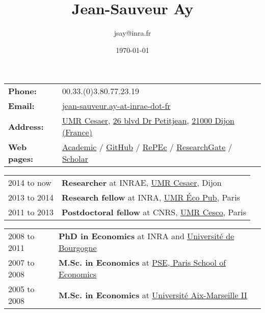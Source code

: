 \documentclass[11pt, a4paper]{./style}
\author{jsay@inra.fr}
\date{\today}
\title{Jean-Sauveur Ay}
\begin{document}
\maketitle


\label{sec:org7ad04d8}

\begin{center}
\begin{tabular}{ll}
\textbf{Phone:} & 00.33.(0)3.80.77.23.19\\[0pt]
\textbf{Email:} & \href{mailto:jean-sauveur.ay@inrae.fr}{jean-sauveur.ay-at-inrae-dot-fr}\\[0pt]
\textbf{Address:} & \href{https://www2.dijon.inrae.fr/cesaer/en/axis/}{UMR Cesaer}, \href{https://www.google.com/maps/?q\%3D47.3097819,5.0644835}{26 blvd Dr Petitjean}, \href{https://www.google.com/maps/place/21000+Dijon/}{21000 Dijon (France)}\\[0pt]
\textbf{Web pages:} & \href{https://www2.dijon.inrae.fr/cesaer/membres/jean-sauveur-ay/}{Academic} / \href{http://github.com/jsay/}{GitHub} / \href{https://ideas.repec.org/e/pay77.html}{RePEc} / \href{https://www.researchgate.net/profile/Jean\_Sauveur\_Ay}{ResearchGate} / \href{https://scholar.google.fr/citations?user=arEwxlIAAAAJ\&hl=fr}{Scholar}\\[0pt]
\end{tabular}
\end{center}

\label{sec:orgf5b8415}

\begin{center}
\begin{tabular}{ll}
2014 to now & \textbf{Researcher} at INRAE, \href{https://www2.dijon.inrae.fr/cesaer/en/axis/}{UMR Cesaer}, Dijon\\[0pt]
2013 to 2014 & \textbf{Research fellow} at INRA, \href{https://www6.versailles-grignon.inrae.fr/economie\_publique\_eng/}{UMR Éco Pub}, Paris\\[0pt]
2011 to 2013 & \textbf{Postdoctoral fellow} at CNRS, \href{http://cesco.mnhn.fr/en}{UMR Cesco}, Paris\\[0pt]
\end{tabular}
\end{center}

\label{sec:org7789a0a}

\begin{center}
\begin{tabular}{ll}
2008 to 2011 & \textbf{PhD in Economics} at INRA and \href{http://en.u-bourgogne.fr/}{Université de Bourgogne}\\[0pt]
2007 to 2008 & \textbf{M.Sc. in Economics} at \href{https://www.parisschoolofeconomics.eu/en/}{PSE, Paris School of Economics}\\[0pt]
2005 to 2008 & \textbf{M.Sc. in Economics} at \href{https://www.amse-aixmarseille.fr/en}{Université Aix-Marseille II}\\[0pt]
\end{tabular}
\end{center}
\end{document}
